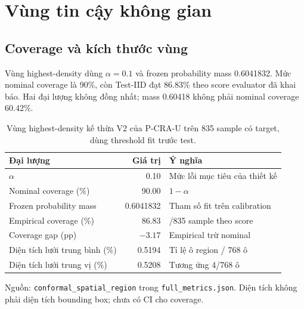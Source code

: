 \section{Vùng tin cậy không gian}
\label{sec:results-region}

\subsection{Coverage và kích thước vùng}

Vùng highest-density dùng $\alpha=0.1$ và
frozen probability mass 0.6041832. Mức nominal
coverage là 90\%, còn Test-IID đạt 86.83\%
theo score evaluator đã khai báo. Hai đại
lượng không đồng nhất; mass 0.60418 không
phải nominal coverage 60.42\%.

\begin{table}[htbp]
    \centering
    \setlength{\tabcolsep}{4pt}
    \renewcommand{\arraystretch}{1.15}
    \caption{Vùng highest-density kế thừa V2 của P-CRA-U trên 835 sample
    có target, dùng threshold fit trước test.}
    \label{tab:results-region}
    \small
    \begin{tabularx}{\textwidth}{@{}>{\raggedright\arraybackslash}Xr>{\raggedright\arraybackslash}X@{}}
        \toprule
        Đại lượng & Giá trị & Ý nghĩa \\
        \midrule
        $\alpha$ & 0.10 & Mức lỗi mục tiêu của thiết kế \\
        Nominal coverage (\%) & 90.00 & $1-\alpha$ \\
        Frozen probability mass & 0.6041832 & Tham số fit trên calibration \\
        Empirical coverage (\%) & 86.83 & 725/835 sample theo score \\
        Coverage gap (pp) & $-3.17$ & Empirical trừ nominal \\
        Diện tích lưới trung bình (\%) & 0.5194 & Tỉ lệ ô region / 768 ô \\
        Diện tích lưới trung vị (\%) & 0.5208 & Tương ứng 4/768 ô \\
        \bottomrule
    \end{tabularx}
    \vspace{2pt}
    {\footnotesize\raggedright Nguồn: \texttt{conformal\_\allowbreak spatial\_\allowbreak region}
    trong \texttt{full\_\allowbreak metrics.json}. Diện tích không phải
    diện tích bounding box; chưa có CI cho coverage.\par}
\end{table}

